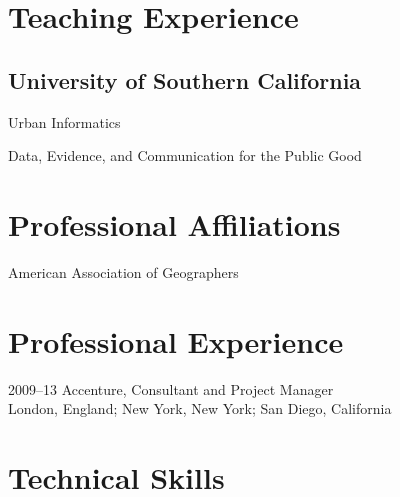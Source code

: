 \documentclass[12pt,letterpaper]{report}
\newcommand{\listitemspace}{0.15em}
\renewenvironment{itemize}
{\begin{list}{}{\setlength{\leftmargin}{0em}
            \setlength{\parskip}{0em}
            \setlength{\itemsep}{\listitemspace}
            \setlength{\parsep}{\listitemspace}}}
    {\end{list}}
\begin{document}
    \section*{Teaching Experience}

    \subsection*{University of Southern California}
    
    \begin{itemize}
    	
    	\item Urban Informatics
    	\item Data, Evidence, and Communication for the Public Good
    
	\end{itemize}
    	

    \section*{Professional Affiliations}

    \begin{itemize}

        \item American Association of Geographers

    \end{itemize}


    \section*{Professional Experience}

    \begin{tablist}

        \item[2009--13] \tab Accenture, Consultant and Project Manager\\
                             London, England; New York, New York; San Diego, California



    \end{tablist}



  



    \section*{Technical Skills}
\end{document}
